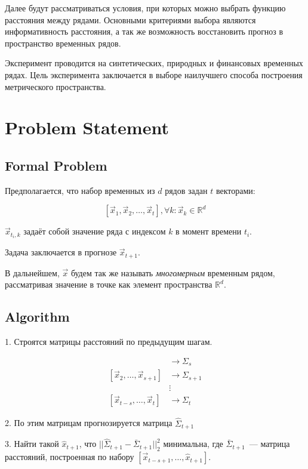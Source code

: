\documentclass{article}
\begin{document}
	Далее будут рассматриваться условия, при которых можно выбрать функцию расстояния между рядами. Основными критериями выбора являются информативность расстояния, а так же возможность восстановить прогноз в пространство временных рядов.
	
	Эксперимент проводится на синтетических, природных и финансовых временных рядах. Цель эксперимента заключается в выборе наилучшего способа построения метрического пространства.

\section{Problem Statement}

\subsection{Formal Problem}

Предполагается, что набор временных из $d$ рядов задан $t$ векторами:

$$[\vec{x}_1, \vec{x}_2, \ldots, \vec{x}_t], \forall k: \vec{x}_k \in \mathbb{R}^d $$

$\vec{x}_{t_i, k}$ задаёт собой значение ряда с индексом $k$ в момент времени $t_i$.

Задача заключается в прогнозе $\vec{x}_{t+1}$.

В дальнейшем, $\vec{x}$ будем так же называть \textit{многомерным} временным рядом, рассматривая значение в точке как элемент пространства $\mathbb{R}^d$.

\subsection{Algorithm}

1. Строятся матрицы расстояний по предыдущим шагам.

\begin{align*}
	[\vec{x}_1, \ldots, \vec{x}_s] &\rightarrow \Sigma_s \\
	[\vec{x}_2, \ldots, \vec{x}_{s+1}] &\rightarrow \Sigma_{s+1} \\
	&\vdots \\
	[\vec{x}_{t-s}, \ldots, \vec{x}_t] &\rightarrow \Sigma_{t}
\end{align*}

2. По этим матрицам прогнозируется матрица $\hat{\Sigma}_{t+1}$

3. Найти такой $\hat{x}_{t+1}$, что $||\hat{\Sigma}_{t+1} - \bar{\Sigma}_{t+1}||_2^2$ минимальна, где $\bar{\Sigma}_{t+1}$~--- матрица расстояний, построенная по набору $[\vec{x}_{t-s+1}, \ldots, \hat{x}_{t+1}]$.
\end{document}
